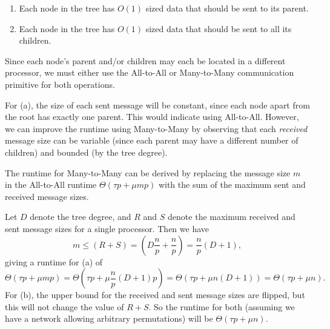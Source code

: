 \documentclass{article}
\begin{document}
\begin{enumerate}[label=(\alph*)]
  \item Each node in the tree has $O(1)$ sized data that should be sent to its parent.
  \item Each node in the tree has $O(1)$ sized data that should be sent to all its children.
\end{enumerate}

\quad Since each node's parent and/or children may each be located in a different processor, we must either use the All-to-All or Many-to-Many communication primitive for both operations.

For (a), the size of each sent message will be constant, since each node apart from the root has exactly one parent.
This would indicate using All-to-All.
However, we can improve the runtime using Many-to-Many by observing that each \textit{received} message size can be variable (since each parent may have a different number of children) and bounded (by the tree degree).

The runtime for Many-to-Many can be derived by replacing the message size $m$ in the All-to-All runtime $\Theta(\tau p + \mu m p)$ with the sum of the maximum sent and received message sizes.

Let $D$ denote the tree degree, and $R$ and $S$ denote the maximum received and sent message sizes for a single processor.
Then we have
$$m \leq (R + S) = \left(D\dfrac{n}{p} + \dfrac{n}{p}\right) = \dfrac{n}{p}(D+1),$$
giving a runtime for (a) of
$$\Theta(\tau p + \mu m p) = \Theta(\tau p + \mu \dfrac{n}{p}(D+1) p) = \Theta(\tau p + \mu n(D+1)) = \Theta(\tau p + \mu n).$$
For (b), the upper bound for the received and sent message sizes are flipped, but this will not change the value of $R + S$.
So the runtime for both (assuming we have a network allowing arbitrary permutations) will be $\Theta(\tau p + \mu n)$.
\end{document}
